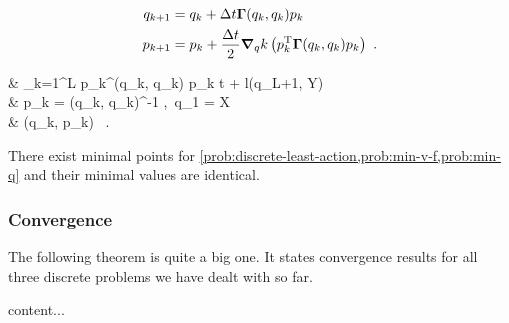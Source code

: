 \begin{equation}
	\label{eq:discrete-hamiltonian-system}
	\begin{split}
		q_{k+1} &= q_k + \Delta t \mathbf{\Gamma}(q_k, q_k) p_k\\
		p_{k+1} &= p_k + \frac{\Delta t}{2} \grad_q{k} \left(p_k^{\mathrm{T}} \mathbf{\Gamma}(q_k, q_k) p_k\right)\ .
	\end{split}
\end{equation}

\begin{problem}
	\label{prob:discrete-least-action}
	\begin{cases}
		 &  \sum_{k=1}^L p_k^\T \bGamma(q_k, q_k) p_k \Delta t + l(q_{L+1}, Y)\\
		 & p_k = \bGamma(q_k, q_k)^{-1} ,\ q_1 = X \\
		& (q_k, p_k) \ .
	\end{cases}
\end{problem}

\begin{theorem}
	There exist minimal points for \cref{prob:discrete-least-action,prob:min-v-f,prob:min-q} and their minimal values are identical.
\end{theorem}


\subsubsection{Convergence}

The following theorem is quite a big one.
It states convergence results for all three discrete problems we have dealt with so far.
\begin{theorem}
	\label{theo:problem-convergence}
	content...
\end{theorem}